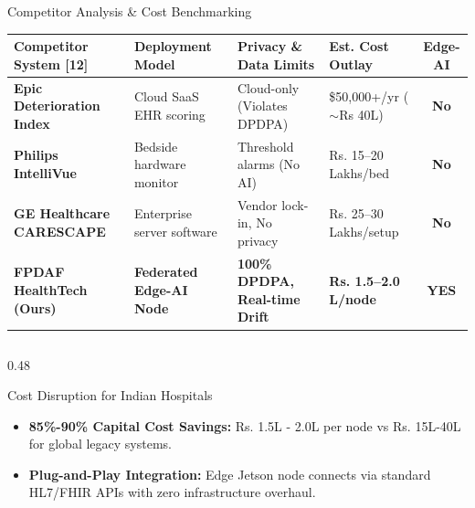\documentclass[aspectratio=169, 11pt]{beamer}
\begin{document}
\begin{frame}{Competitor Analysis \& Cost Benchmarking}
    \centering
    \tiny
    \setlength{\tabcolsep}{4pt}
    \renewcommand{\arraystretch}{1.25}
    \begin{tabular}{p{3.2cm} p{2.6cm} p{3.2cm} p{2.2cm} c}
    \hline
    \rowcolor{lightCyanBg}
    \textbf{\textcolor{neonCyan}{Competitor System [12]}} & \textbf{\textcolor{neonCyan}{Deployment Model}} & \textbf{\textcolor{neonCyan}{Privacy \& Data Limits}} & \textbf{\textcolor{neonCyan}{Est. Cost Outlay}} & \textbf{\textcolor{neonCyan}{Edge-AI}} \\
    \hline
    \textbf{Epic Deterioration Index} & Cloud SaaS EHR scoring & Cloud-only (Violates DPDPA) & \$50,000+/yr ($\sim$Rs 40L) & \textcolor{neonRose}{\textbf{No}} \\
    \textbf{Philips IntelliVue} & Bedside hardware monitor & Threshold alarms (No AI) & Rs. 15--20 Lakhs/bed & \textcolor{neonRose}{\textbf{No}} \\
    \textbf{GE Healthcare CARESCAPE} & Enterprise server software & Vendor lock-in, No privacy & Rs. 25--30 Lakhs/setup & \textcolor{neonRose}{\textbf{No}} \\
    \rowcolor{lightTealBg}
    \textbf{\textcolor{textColor}{FPDAF HealthTech (Ours)}} & \textbf{\textcolor{textColor}{Federated Edge-AI Node}} & \textbf{\textcolor{textColor}{100\% DPDPA, Real-time Drift}} & \textbf{\textcolor{neonTeal}{Rs. 1.5--2.0 L/node}} & \textbf{\textcolor{neonTeal}{YES}} \\
    \hline
    \end{tabular}
    
    \vspace{0.12cm}
    \begin{columns}[t]
        \begin{column}{0.48\textwidth}
            \begin{block}{\textcolor{neonAmber}{Cost Disruption for Indian Hospitals}}
                \tiny
                \begin{itemize}
                    \item \textbf{85\%-90\% Capital Cost Savings:} Rs. 1.5L - 2.0L per node vs Rs. 15L-40L for global legacy systems.
                    \item \textbf{Plug-and-Play Integration:} Edge Jetson node connects via standard HL7/FHIR APIs with zero infrastructure overhaul.
                \end{itemize}
            \end{block}
        \end{column}
        

\end{columns}
\end{frame}
\end{document}
